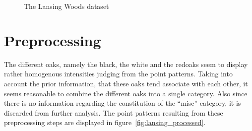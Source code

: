 \documentclass[12pt,a4paper,oneside,article]{memoir}
\begin{document}
\begin{figure}[htb]
\begin{adjustwidth}{-2in}{-2in}
  \end{adjustwidth}
  \caption{The Lansing Woods dataset}
  \label{fig:lansing_separate}
\end{figure}

 \section{Preprocessing}

The different oaks, namely the black, the white and the redoaks seem to
display rather homogenous intensities judging from the point patterns.
Taking into account the prior information, that these oaks tend associate
with each other, it seems reasonable to combine the different oaks into
a single category. Also since there is no information regarding the constitution
of the ``misc'' category, it is discarded from further analysis. The point patterns
resulting from these preprocessing steps are displayed in figure~\ref{fig:lansing_processed}. 
\end{document}
